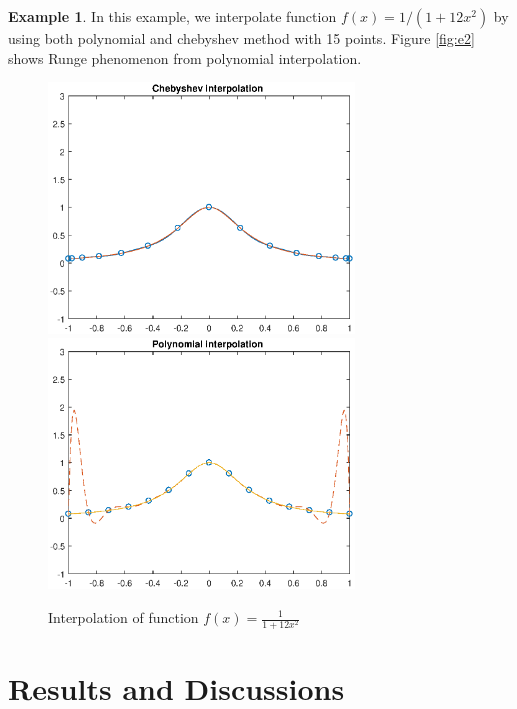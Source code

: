 \documentclass[11pt]{amsart}
\theoremstyle{definition}
\newtheorem{exmp}{Example}[section]
\begin{document}
\begin{exmp}
In this example, we interpolate function $f(x)=1/(1+12x^2)$ by using both polynomial and chebyshev method with 15 points. Figure \eqref{fig:e2} shows Runge phenomenon from polynomial interpolation.\\
\begin{figure}     	\centerline{\includegraphics[width=3.2in]{./figs/e2a.eps}
      	\hspace{-6pt}
     	\includegraphics[width=3.2in]{./figs/e2b.eps}}
     	\hspace{-6pt}
		\caption{Interpolation of function $f(x)=\frac{1}{1+12x^2}$}
        \label{fig:e2}
\end{figure}
\end{exmp}

\section{Results and Discussions}
\end{document}
